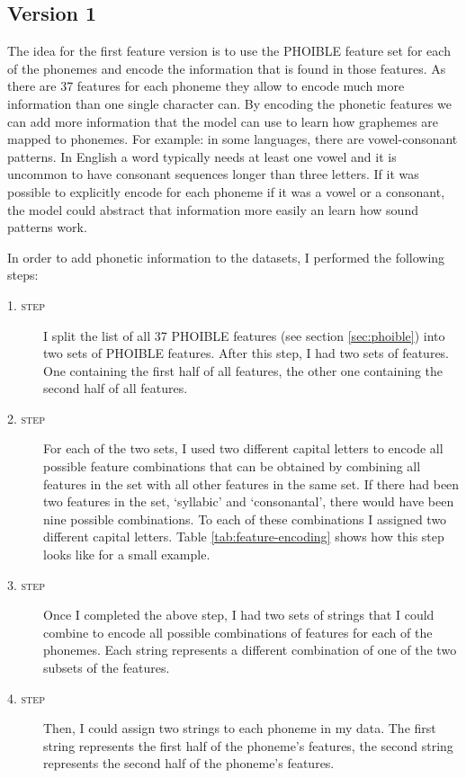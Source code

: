 \subsection*{Version 1}

The idea for the first feature version is to use the PHOIBLE feature set for each of the phonemes and encode the information that is found in those features. As there are 37 features for each phoneme they allow to encode much more information than one single character can. By encoding the phonetic features we can add more information that the model can use to learn how graphemes are mapped to phonemes. For example: in some languages, there are vowel-consonant patterns. In English a word typically needs at least one vowel and it is uncommon to have consonant sequences longer than three letters. If it was possible to explicitly encode for each phoneme if it was a vowel or a consonant, the model could abstract that information more easily an learn how sound patterns work. 

In order to add phonetic information to the datasets, I performed the following steps:
\begin{description}
    \item[\textsc{1. step}] I split the list of all 37 PHOIBLE features (see section \ref{sec:phoible}) into two sets of PHOIBLE features. After this step, I had two sets of features. One containing the first half of all features, the other one containing the second half of all features.
    \item[\textsc{2. step}] For each of the two sets, I used two different capital letters to encode all possible feature combinations that can be obtained by combining all features in the set with all other features in the same set. If there had been two features in the set, `syllabic' and `consonantal', there would have been nine possible combinations. To each of these combinations I assigned two different capital letters. Table \ref{tab:feature-encoding} shows how this step looks like for a small example. 
    \item[\textsc{3. step}] Once I completed the above step, I had two sets of strings that I could combine to encode all possible combinations of features for each of the phonemes. Each string represents a different combination of one of the two subsets of the features.
    \item[\textsc{4. step}] Then, I could assign two strings to each phoneme in my data. The first string represents the first half of the phoneme's features, the second string represents the second half of the phoneme's features.
\end{description}

